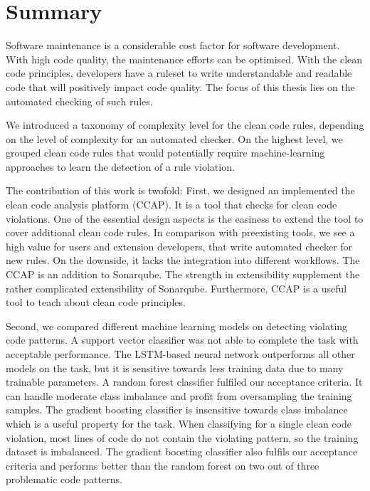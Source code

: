 \section{Summary}
Software maintenance is a considerable cost factor for software development. With high code quality, the maintenance efforts can be optimised. With the clean code principles, developers have a ruleset to write understandable and readable code that will positively impact code quality. The focus of this thesis lies on the automated checking of such rules.

We introduced a taxonomy of complexity level for the clean code rules, depending on the level of complexity for an automated checker. On the highest level, we grouped clean code rules that would potentially require machine-learning approaches to learn the detection of a rule violation. 

The contribution of this work is twofold: 
First, we designed an implemented the clean code analysis platform (CCAP). It is a tool that checks for clean code violations. One of the essential design aspects is the easiness to extend the tool to cover additional clean code rules. In comparison with preexisting tools, we see a high value for users and extension developers, that write automated checker for new rules. On the downside, it lacks the integration into different workflows. The CCAP is an addition to Sonarqube. The strength in extensibility supplement the rather complicated extensibility of Sonarqube. Furthermore, CCAP is a useful tool to teach about clean code principles.

Second, we compared different machine learning models on detecting violating code patterns. A support vector classifier was not able to complete the task with acceptable performance. The LSTM-based neural network outperforms all other models on the task, but it is sensitive towards less training data due to many trainable parameters.
A random forest classifier fulfiled our acceptance criteria. It can handle moderate class imbalance and profit from oversampling the training samples. The gradient boosting classifier is insensitive towards class imbalance which is a useful property for the task. When classifying for a single clean code violation, most lines of code do not contain the violating pattern, so the training dataset is imbalanced. The gradient boosting classifier also fulfils our acceptance criteria and performs better than the random forest on two out of three problematic code patterns.

